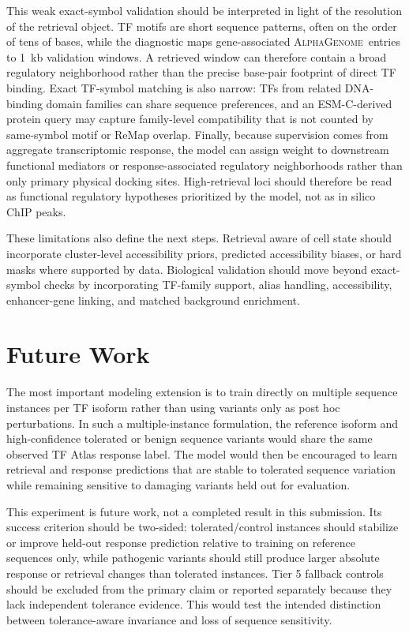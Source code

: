 \documentclass{article}
\newcommand{\ag}{\textsc{AlphaGenome}}
\newcommand{\esm}{\textsc{ESM-C}}
\begin{document}
This weak exact-symbol validation should be interpreted in light of the resolution of the retrieval object. TF motifs are short sequence patterns, often on the order of tens of bases, while the diagnostic maps gene-associated \ag\ entries to 1~kb validation windows. A retrieved window can therefore contain a broad regulatory neighborhood rather than the precise base-pair footprint of direct TF binding. Exact TF-symbol matching is also narrow: TFs from related DNA-binding domain families can share sequence preferences, and an \esm-derived protein query may capture family-level compatibility that is not counted by same-symbol motif or ReMap overlap. Finally, because supervision comes from aggregate transcriptomic response, the model can assign weight to downstream functional mediators or response-associated regulatory neighborhoods rather than only primary physical docking sites. High-retrieval loci should therefore be read as functional regulatory hypotheses prioritized by the model, not as in silico ChIP peaks.

These limitations also define the next steps. Retrieval aware of cell state should incorporate cluster-level accessibility priors, predicted accessibility biases, or hard masks where supported by data. Biological validation should move beyond exact-symbol checks by incorporating TF-family support, alias handling, accessibility, enhancer-gene linking, and matched background enrichment.

\section{Future Work}

The most important modeling extension is to train directly on multiple sequence instances per TF isoform rather than using variants only as post hoc perturbations. In such a multiple-instance formulation, the reference isoform and high-confidence tolerated or benign sequence variants would share the same observed TF Atlas response label. The model would then be encouraged to learn retrieval and response predictions that are stable to tolerated sequence variation while remaining sensitive to damaging variants held out for evaluation.

This experiment is future work, not a completed result in this submission. Its success criterion should be two-sided: tolerated/control instances should stabilize or improve held-out response prediction relative to training on reference sequences only, while pathogenic variants should still produce larger absolute response or retrieval changes than tolerated instances. Tier 5 fallback controls should be excluded from the primary claim or reported separately because they lack independent tolerance evidence. This would test the intended distinction between tolerance-aware invariance and loss of sequence sensitivity.
\end{document}
